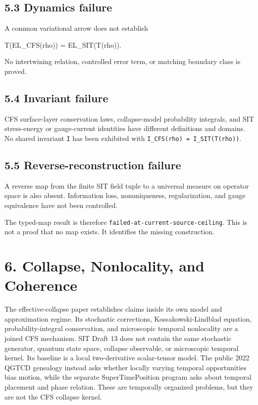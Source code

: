 \documentclass[
  american,
  11pt,
  letterpaper,
]{article}
\newenvironment{Shaded}{}{}
\newcommand{\NormalTok}[1]{#1}
\begin{document}
\subsection{5.3 Dynamics failure}\label{dynamics-failure}

A common variational arrow does not establish

\begin{Shaded}
\begin{Highlighting}[]
\NormalTok{T(EL\_CFS(rho)) = EL\_SIT(T(rho)).}
\end{Highlighting}
\end{Shaded}

No intertwining relation, controlled error term, or matching boundary class is proved.

\subsection{5.4 Invariant failure}\label{invariant-failure}

CFS surface-layer conservation laws, collapse-model probability integrals, and SIT stress-energy or gauge-current identities have different definitions and domains. No shared invariant \texttt{I} has been exhibited with \texttt{I\_CFS(rho)\ =\ I\_SIT(T(rho))}.

\subsection{5.5 Reverse-reconstruction failure}\label{reverse-reconstruction-failure}

A reverse map from the finite SIT field tuple to a universal measure on operator space is also absent. Information loss, nonuniqueness, regularization, and gauge equivalence have not been controlled.

The typed-map result is therefore \nolinkurl{failed-at-current-source-ceiling}. This is not a proof that no map exists. It identifies the missing construction.

\section{6. Collapse, Nonlocality, and Coherence}\label{collapse-nonlocality-and-coherence}

The effective-collapse paper establishes claims inside its own model and approximation regime. Its stochastic corrections, Kossakowski-Lindblad equation, probability-integral conservation, and microscopic temporal nonlocality are a joined CFS mechanism. SIT Draft 13 does not contain the same stochastic generator, quantum state space, collapse observable, or microscopic temporal kernel. Its baseline is a local two-derivative scalar-tensor model. The public 2022 QGTCD genealogy instead asks whether locally varying temporal opportunities bias motion, while the separate SuperTimePosition program asks about temporal placement and phase relation. These are temporally organized problems, but they are not the CFS collapse kernel.
\end{document}
